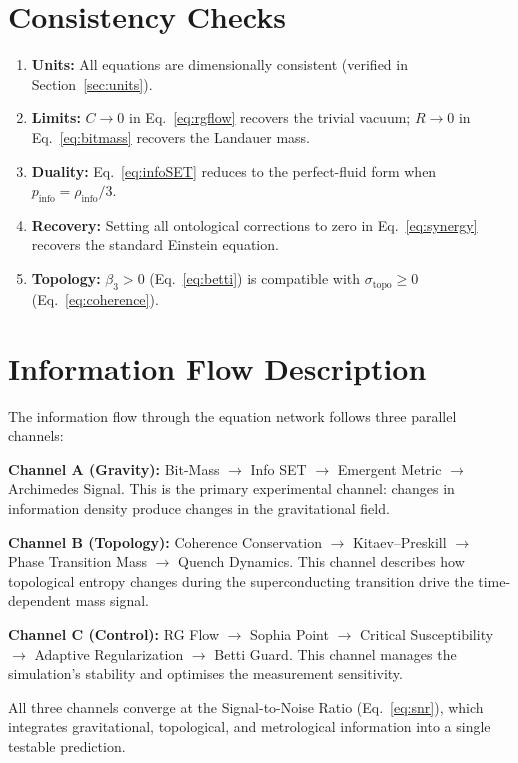 \documentclass[11pt,a4paper]{article}
\theoremstyle{remark}
\begin{document}
\section{Consistency Checks}
\label{sec:consistency}

\begin{enumerate}[nosep]
    \item \textbf{Units:} All equations are dimensionally consistent (verified in Section~\ref{sec:units}).
    \item \textbf{Limits:} $C \to 0$ in Eq.~\eqref{eq:rgflow} recovers the trivial vacuum; $R \to 0$ in Eq.~\eqref{eq:bitmass} recovers the Landauer mass.
    \item \textbf{Duality:} Eq.~\eqref{eq:infoSET} reduces to the perfect-fluid form when $p_{\text{info}} = \rho_{\text{info}}/3$.
    \item \textbf{Recovery:} Setting all ontological corrections to zero in Eq.~\eqref{eq:synergy} recovers the standard Einstein equation.
    \item \textbf{Topology:} $\beta_3 > 0$ (Eq.~\eqref{eq:betti}) is compatible with $\sigma_{\text{topo}} \geq 0$ (Eq.~\eqref{eq:coherence}).
\end{enumerate}

\section{Information Flow Description}
\label{sec:infoflow}

The information flow through the equation network follows three parallel channels:

\textbf{Channel A (Gravity):}
Bit-Mass $\to$ Info SET $\to$ Emergent Metric $\to$ Archimedes Signal.  This is the primary experimental channel: changes in information density produce changes in the gravitational field.

\textbf{Channel B (Topology):}
Coherence Conservation $\to$ Kitaev--Preskill $\to$ Phase Transition Mass $\to$ Quench Dynamics.  This channel describes how topological entropy changes during the superconducting transition drive the time-dependent mass signal.

\textbf{Channel C (Control):}
RG Flow $\to$ Sophia Point $\to$ Critical Susceptibility $\to$ Adaptive Regularization $\to$ Betti Guard.  This channel manages the simulation's stability and optimises the measurement sensitivity.

All three channels converge at the Signal-to-Noise Ratio (Eq.~\eqref{eq:snr}), which integrates gravitational, topological, and metrological information into a single testable prediction.
\end{document}
